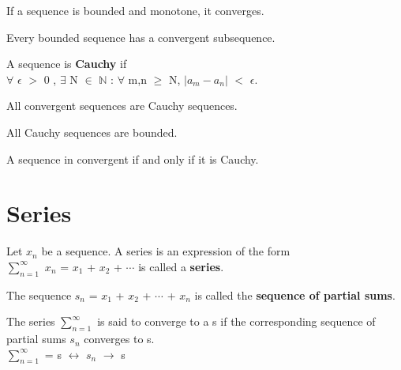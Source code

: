 \documentclass{report}
\begin{document}
\begin{theorem}
If a sequence is bounded and monotone, it converges.
\end{theorem}

\begin{theorem}
Every bounded sequence has a convergent subsequence.
\end{theorem}

\begin{definition}
A sequence is \textbf{Cauchy} if\\
$\forall$ $\epsilon$ $>$ 0 , $\exists$ N $\in$ $\mathbb{N}$ : $\forall$ m,n $\geq$ N, $\lvert a_m - a_n \rvert$ $<$ $\epsilon$.
\end{definition}

\begin{theorem}
All convergent sequences are Cauchy sequences.
\end{theorem}

\begin{theorem}
All Cauchy sequences are bounded.
\end{theorem}

\begin{theorem}
A sequence in convergent if and only if it is Cauchy.
\end{theorem}

\section{Series}
\begin{definition}
Let $x_n$ be a sequence. A series is an expression of the form \\ 
$\sum_{n=1}^{\infty}$ $x_n$ = $x_1$ + $x_2$ + $\cdots$ is called a \textbf{series}.
\end{definition}

\begin{definition}
The sequence $s_n$ = $x_1$ + $x_2$ + $\cdots$ + $x_n$ is called the \textbf{sequence of partial sums}.
\end{definition}
The series $\sum_{n=1}^{\infty}$ is said to converge to a s if the corresponding sequence of partial sums $s_n$ converges to s.\\
$\sum_{n=1}^{\infty}$ = s $\leftrightarrow$  $s_n$ $\rightarrow$ s
\end{document}
